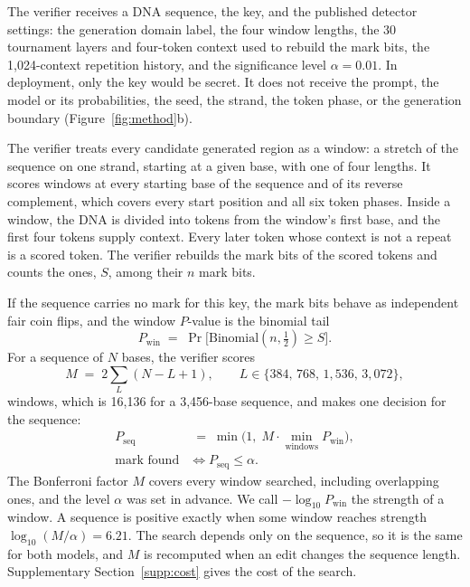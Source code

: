 \documentclass[10pt,twocolumn]{article}
\begin{document}
The verifier receives a DNA sequence, the key, and the published detector settings: the
generation domain label, the four window lengths, the 30 tournament layers and four-token context
used to rebuild the mark bits, the 1{,}024-context repetition history, and the significance level
$\alpha = 0.01$. In deployment, only the key would be secret.
It does not receive the prompt, the model or its probabilities, the seed, the strand, the token
phase, or the generation boundary (Figure~\ref{fig:method}b).

The verifier treats every candidate generated region as a window: a stretch of the sequence on one
strand, starting at a given base, with one of four lengths. It scores windows at every starting
base of the sequence and of its reverse complement, which covers every start position and all six
token phases. Inside a window, the DNA is divided into tokens from the window's first base, and the
first four tokens supply context. Every later token whose context is not a repeat is a scored
token. The verifier rebuilds the mark bits of the scored tokens and counts the ones, $S$, among
their $n$ mark bits.

If the sequence carries no mark for this key, the mark bits behave as independent fair coin flips, and
the window $P$-value is the binomial tail
\begin{equation}
P_{\mathrm{win}} \;=\; \Pr\bigl[\mathrm{Binomial}(n, \tfrac{1}{2}) \geq S\bigr].
\end{equation}
For a sequence of $N$ bases, the verifier scores
\begin{equation}
M \;=\; 2\sum_{L} (N - L + 1), \qquad L \in \{384,\, 768,\, 1{,}536,\, 3{,}072\},
\end{equation}
windows, which is 16{,}136 for a 3{,}456-base sequence, and makes one decision for the sequence:
\begin{equation}
\begin{aligned}
P_{\mathrm{seq}} &\;=\; \min\bigl(1,\; M \cdot \min_{\text{windows}} P_{\mathrm{win}}\bigr),\\
\text{mark found} &\iff P_{\mathrm{seq}} \leq \alpha .
\end{aligned}
\end{equation}
The Bonferroni factor $M$ covers every window searched, including overlapping ones, and the level
$\alpha$ was set in advance. We call $-\log_{10} P_{\mathrm{win}}$ the strength of a window.
A sequence is positive exactly when some window reaches strength $\log_{10}(M/\alpha) = 6.21$. The
search depends only on the sequence, so it is the same for both models, and $M$ is recomputed when an
edit changes the sequence length. Supplementary Section~\ref{supp:cost} gives the cost of the search.
\end{document}
